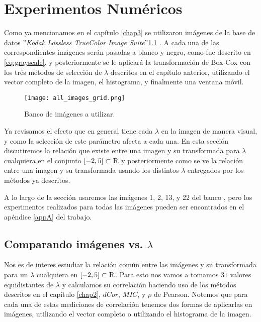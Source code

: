 \chapter{Experimentos Num\'ericos}\label{chap5}

    Como ya mencionamos en el cap\'itulo \ref{chap3} se utilizaron im\'agenes de la base de datos ''\textit{Kodak Lossless TrueColor Image Suite}''\ref{fig:rgb2gray_2} \cite{KodakLosslessTrueColorImageSuite}. A cada una de las correspondientes im\'agenes ser\'an pasadas a blanco y negro, como fue descrito en \ref{eq:grayscale}, y posteriormente se le aplicar\'a la transformaci\'on de Box-Cox con los tr\'es m\'etodos de selecci\'on de $\lambda$ descritos en el cap\'itulo anterior, utilizando el vector completo de la imagen, el histograma, y finalmente una ventana m\'ovil.

    \begin{figure}[H]
        \centering
        \texttt{[image: all\_images\_grid.png]}
        \caption{Banco de im\'agenes a utilizar.}
        \label{fig:rgb2gray_2}
    \end{figure}
    
    Ya revisamos el efecto que en general tiene cada $\lambda$ en la imagen de manera visual, y como la selecci\'on de este par\'ametro afecta a cada una. En esta secci\'on discutiremos la relaci\'on que existe entre una imagen y su transformada para $\lambda$ cualquiera en el conjunto $[-2, 5]\subset\textsc{R}$ y posteriormente como se ve la relaci\'on entre una imagen y su transformada usando los distintos $\lambda$ entregados por los m\'etodos ya descritos.

    A lo largo de la secci\'on usaremos las im\'agenes 1, 2, 13, y 22 del banco \cite{KodakLosslessTrueColorImageSuite}, pero los experimentos realizados para todas las im\'agenes pueden ser encontrados en el ap\'endice \ref{appA} del trabajo. 
    

\section[Comparando im\'agenes vs. lambda]{Comparando im\'agenes vs. $\lambda$}

    Nos es de interes estudiar la relaci\'on com\'un entre las im\'agenes y su transformada para un $\lambda$ cualquiera en $[-2, 5]\subset\textsc{R}$. Para esto nos vamos a tomamos $31$ valores equidistantes de $\lambda$ y calculamos su correlaci\'on haciendo uso de los m\'etodos descritos en el cap\'itulo \ref{chap2}, $dCor$, $MIC$, y $\rho$ de Pearson. Notemos que para cada una de estas mediciones de correlaci\'on tenemos dos formas de aplicarlas en im\'agenes, utilizando el vector completo o utilizando el histograma de la imagen. 

